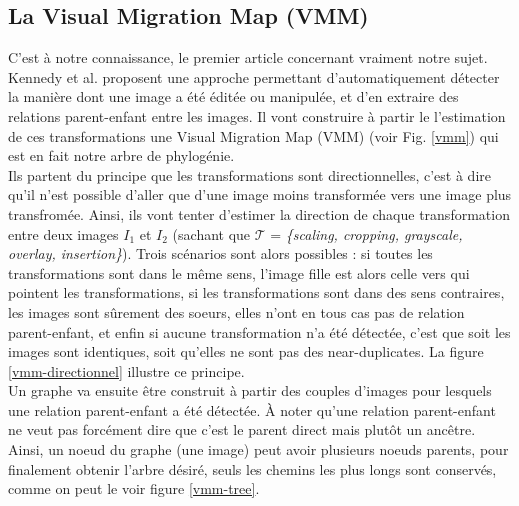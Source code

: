 \documentclass[utf8]{stageM2R} %
\begin{document}
\subsection{La Visual Migration Map (VMM)}
C'est à notre connaissance, le premier article concernant vraiment notre sujet. Kennedy et al. \cite{kennedy2008internet} proposent une approche permettant d'automatiquement détecter la manière dont une image a été éditée ou manipulée, et d'en extraire des relations parent-enfant entre les images. Il vont construire à partir le l'estimation de ces transformations une Visual Migration Map (VMM) (voir Fig. \ref{vmm}) qui est en fait notre arbre de phylogénie.
\\ \indent
Ils partent du principe que les transformations sont directionnelles, c'est à dire qu'il n'est possible d'aller que d'une image moins transformée vers une image plus transfromée. Ainsi, ils vont tenter d'estimer la direction de chaque transformation entre deux images $I_{1}$ et $I_{2}$ (sachant que $\mathcal{T}$ = \textit{\{scaling, cropping, grayscale, overlay, insertion\}}). Trois scénarios sont alors possibles : si toutes les transformations sont dans le même sens, l'image fille est alors celle vers qui pointent les transformations, si les transformations sont dans des sens contraires, les images sont sûrement des soeurs, elles n'ont en tous cas pas de relation parent-enfant, et enfin si aucune transformation n'a été détectée, c'est que soit les images sont identiques, soit qu'elles ne sont pas des near-duplicates. La figure \ref{vmm-directionnel} illustre ce principe.
\\ \indent
Un graphe va ensuite être construit à partir des couples d'images pour lesquels une relation parent-enfant a été détectée. À noter qu'une relation parent-enfant ne veut pas forcément dire que c'est le parent direct mais plutôt un ancêtre. Ainsi, un noeud du graphe (une image) peut avoir plusieurs noeuds parents, pour finalement obtenir l'arbre désiré, seuls les chemins les plus longs sont conservés, comme on peut le voir figure \ref{vmm-tree}.


\end{document}
